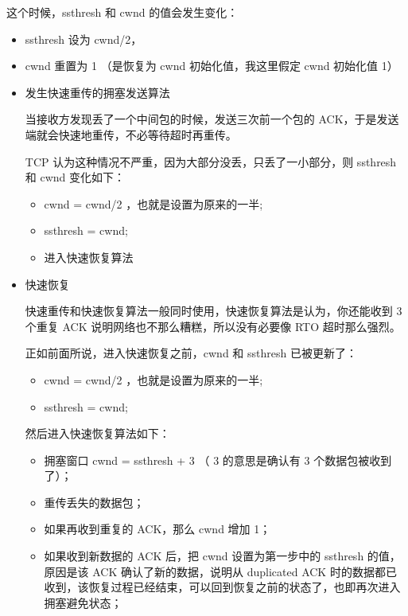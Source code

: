 \documentclass[11pt]{article}
\begin{document}
\begin{enumerate}
这个时候，ssthresh 和 cwnd 的值会发生变化：
\begin{itemize}
\item ssthresh 设为 cwnd/2，
\item cwnd 重置为 1 （是恢复为 cwnd 初始化值，我这里假定 cwnd 初始化值 1）

\item 发生快速重传的拥塞发送算法

当接收方发现丢了一个中间包的时候，发送三次前一个包的 ACK，于是发送端就会快速地重传，不必等待超时再重传。

TCP 认为这种情况不严重，因为大部分没丢，只丢了一小部分，则 ssthresh 和 cwnd 变化如下：

\begin{itemize}
\item cwnd = cwnd/2 ，也就是设置为原来的一半;

\item ssthresh = cwnd;

\item 进入快速恢复算法
\end{itemize}

\item 快速恢复

快速重传和快速恢复算法一般同时使用，快速恢复算法是认为，你还能收到 3 个重复 ACK 说明网络也不那么糟糕，所以没有必要像 RTO 超时那么强烈。

正如前面所说，进入快速恢复之前，cwnd 和 ssthresh 已被更新了：
\begin{itemize}
\item cwnd = cwnd/2 ，也就是设置为原来的一半;

\item ssthresh = cwnd;
\end{itemize}
然后进入快速恢复算法如下：
\begin{itemize}
\item 拥塞窗口 cwnd = ssthresh + 3 （ 3 的意思是确认有 3 个数据包被收到了）；

\item 重传丢失的数据包；

\item 如果再收到重复的 ACK，那么 cwnd 增加 1；

\item 如果收到新数据的 ACK 后，把 cwnd 设置为第一步中的 ssthresh 的值，原因是该 ACK 确认了新的数据，说明从 duplicated ACK 时的数据都已收到，该恢复过程已经结束，可以回到恢复之前的状态了，也即再次进入拥塞避免状态；
\end{itemize}
\end{itemize}


\end{enumerate}
\end{document}
